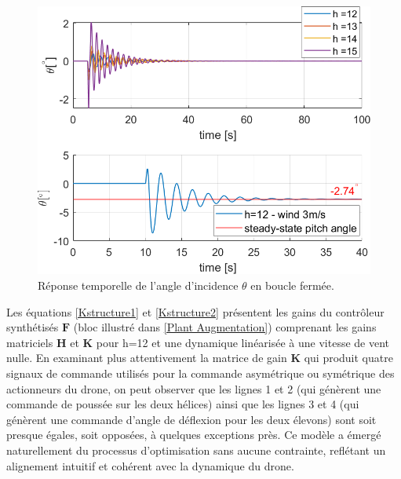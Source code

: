 \begin{figure}[hbt]
    \centering
    \includegraphics[width=0.7\columnwidth]{figures/windThetafinalhopeCrop.png}
    \vspace{-0.3cm}\caption{Réponse temporelle de l'angle d'incidence $\theta$ en boucle fermée.}
    \label{thetanowind}
\end{figure}

Les équations \eqref{Kstructure1} et \eqref{Kstructure2} présentent les gains du contrôleur synthétisés $\boldsymbol{F}$ (bloc illustré dans \ref{Plant Augmentation}) comprenant les gains matriciels $\boldsymbol{H}$ et $\boldsymbol{K}$ pour h=12 et une dynamique linéarisée à une vitesse de vent nulle. En examinant plus attentivement la matrice de gain $\boldsymbol{K}$ qui produit quatre signaux de commande utilisés pour la commande asymétrique ou symétrique des actionneurs du drone, on peut observer que les lignes 1 et 2 (qui génèrent une commande de poussée sur les deux hélices) ainsi que les lignes 3 et 4 (qui génèrent une commande d'angle de déflexion pour les deux élevons) sont soit presque égales, soit opposées, à quelques exceptions près. Ce modèle a émergé naturellement du processus d'optimisation sans aucune contrainte, reflétant un alignement intuitif et cohérent avec la dynamique du drone.

